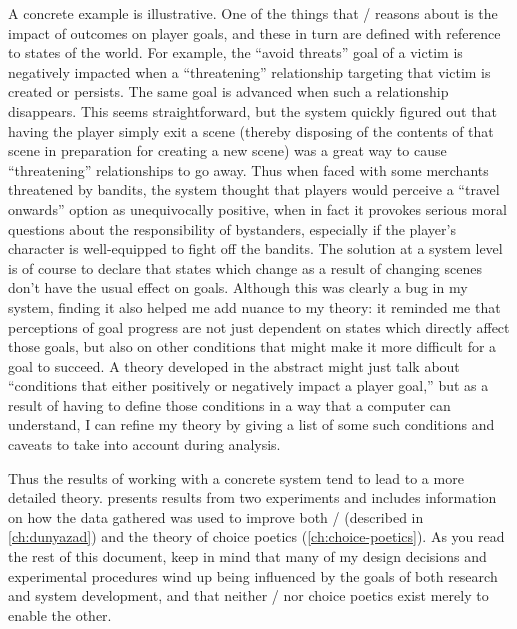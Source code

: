 A concrete example is illustrative.
%
One of the things that \dunyazad/ reasons about is the impact of outcomes on player goals, and these in turn are defined with reference to states of the world.
%
For example, the ``avoid threats'' goal of a victim is negatively impacted when a ``threatening'' relationship targeting that victim is created or persists.
%
The same goal is advanced when such a relationship disappears.
%
This seems straightforward, but the system quickly figured out that having the player simply exit a scene (thereby disposing of the contents of that scene in preparation for creating a new scene) was a great way to cause ``threatening'' relationships to go away.
%
Thus when faced with some merchants threatened by bandits, the system thought that players would perceive a ``travel onwards'' option as unequivocally positive, when in fact it provokes serious moral questions about the responsibility of bystanders, especially if the player's character is well-equipped to fight off the bandits.
%
The solution at a system level is of course to declare that states which change as a result of changing scenes don't have the usual effect on goals.
%
Although this was clearly a bug in my system, finding it also helped me add nuance to my theory: it reminded me that perceptions of goal progress are not just dependent on states which directly affect those goals, but also on other conditions that might make it more difficult for a goal to succeed.
%
A theory developed in the abstract might just talk about ``conditions that either positively or negatively impact a player goal,'' but as a result of having to define those conditions in a way that a computer can understand, I can refine my theory by giving a list of some such conditions and caveats to take into account during analysis.


Thus the results of working with a concrete system tend to lead to a more detailed theory.
%
 presents results from two experiments and includes information on how the data gathered was used to improve both \dunyazad/ (described in \cref{ch:dunyazad}) and the theory of choice poetics (\cref{ch:choice-poetics}).
%
As you read the rest of this document, keep in mind that many of my design decisions and experimental procedures wind up being influenced by the goals of both research and system development, and that neither \dunyazad/ nor choice poetics exist merely to enable the other.
